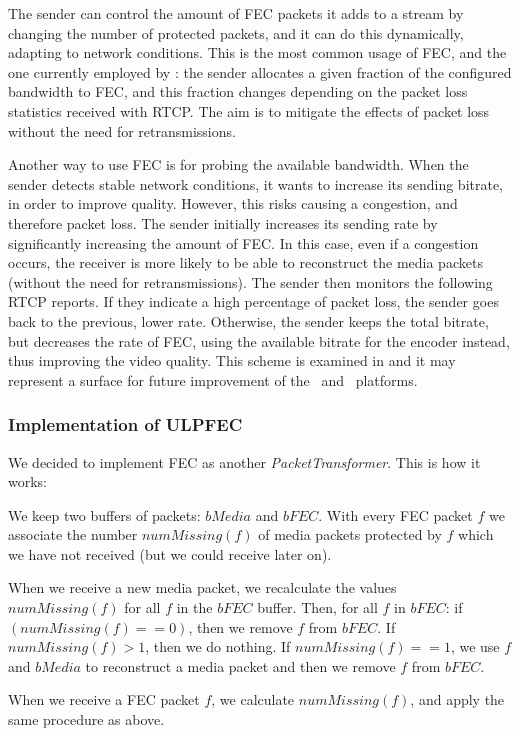 \documentclass[twoside,openright,a4paper,12pt,english]{article}
\begin{document}
The sender can control the amount of FEC packets it adds to a stream by changing the
number of protected packets, and it can do this dynamically, adapting
to network conditions. This is the most common usage of FEC, and the
one currently employed by \wrtc: the sender allocates a given fraction of the configured bandwidth
to FEC, and this fraction changes depending on the packet loss
statistics received with RTCP. The aim is to mitigate the effects of packet
loss without the need for retransmissions. 

Another way to use FEC is for probing the available bandwidth. When the sender
detects stable network conditions, it wants to increase its sending bitrate, in
order to improve quality. However, this risks causing a congestion, and therefore
packet loss. The sender initially increases its sending rate by significantly
increasing the amount of FEC. In this case, even if a congestion occurs, the receiver
is more likely to be able to reconstruct the media packets (without the need for
retransmissions). The sender then monitors the following RTCP reports. If they
indicate a high percentage of packet loss, the sender goes back to the
previous, lower rate. Otherwise, the sender keeps the total bitrate, but decreases
the rate of FEC, using the available bitrate for the encoder instead, thus improving
the video quality. This scheme is examined in \cite{NagySOE13}
and it may represent a surface for future improvement of the \jvb\ and \jm\ platforms.


\subsubsection{Implementation of ULPFEC}
We decided to implement FEC as another \emph{PacketTransformer}. This is how it works:

We keep two buffers of packets: $bMedia$ and $bFEC$. With every FEC packet $f$
we associate the number $numMissing(f)$ of media packets protected by $f$
which we have not received (but we could receive later on).

When we receive a new media packet, we recalculate the values $numMissing(f)$ for
all $f$ in the $bFEC$ buffer. Then, for all $f$ in $bFEC$: if $(numMissing(f)
== 0)$, then we remove $f$ from $bFEC$. If $numMissing(f) > 1$, then we do
nothing. If $numMissing(f) == 1$, we use $f$ and $bMedia$ to reconstruct a media
packet and then we remove $f$ from $bFEC$.

When we receive a FEC packet $f$, we calculate $numMissing(f)$, and apply the same procedure
as above. 
\end{document}
